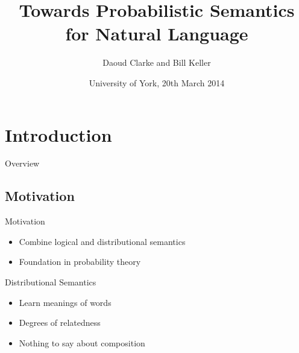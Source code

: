 \documentclass{beamer}
\title%
{Towards Probabilistic Semantics for Natural Language}
\author[Department of Informatics, University of Sussex] %
{Daoud Clarke and Bill Keller}
\institute[University of Sussex] %
{
  Department of Informatics\\
  University of Sussex}
\date[University of York] %
{University of York, 20th March 2014}
\newlength{\wideitemsep}
\let\olditem\item
\renewcommand{\item}{\setlength{\itemsep}{\wideitemsep}\olditem}
\begin{document}
\begin{frame}
  \titlepage
\end{frame}

\section{Introduction}

\begin{frame}{Overview}
  \tableofcontents
\end{frame}





\subsection{Motivation}

\begin{frame}{Motivation}
\begin{itemize}
\item Combine logical and distributional semantics
\item Foundation in probability theory
\end{itemize}
\end{frame}

\begin{frame}{Distributional Semantics}
\begin{itemize}
\item Learn meanings of words
\item Degrees of relatedness
\item Nothing to say about composition
\end{itemize}
\end{frame}
\end{document}

